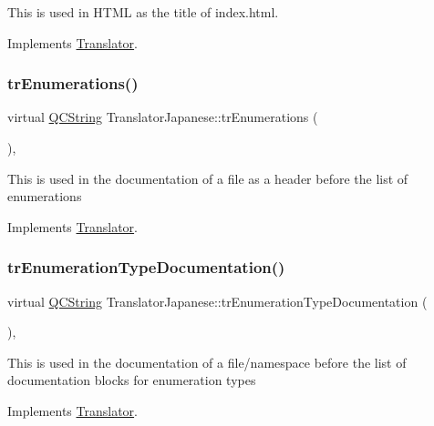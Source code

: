 This is used in H\+T\+ML as the title of index.\+html. 

Implements \mbox{\hyperlink{class_translator}{Translator}}.

\mbox{\label{class_translator_japanese_a77f78f5be3931f3684fd6f74e6b2b133}} 
\subsubsection{\texorpdfstring{trEnumerations()}{trEnumerations()}}
{\footnotesize\ttfamily virtual \mbox{\hyperlink{class_q_c_string}{Q\+C\+String}} Translator\+Japanese\+::tr\+Enumerations (\begin{DoxyParamCaption}{ }\end{DoxyParamCaption})\hspace{0.3cm}{\ttfamily [inline]}, {\ttfamily [virtual]}}

This is used in the documentation of a file as a header before the list of enumerations 

Implements \mbox{\hyperlink{class_translator}{Translator}}.

\mbox{\label{class_translator_japanese_a1165e4f89a8686a1aad2bfcb7d702c0b}} 
\subsubsection{\texorpdfstring{trEnumerationTypeDocumentation()}{trEnumerationTypeDocumentation()}}
{\footnotesize\ttfamily virtual \mbox{\hyperlink{class_q_c_string}{Q\+C\+String}} Translator\+Japanese\+::tr\+Enumeration\+Type\+Documentation (\begin{DoxyParamCaption}{ }\end{DoxyParamCaption})\hspace{0.3cm}{\ttfamily [inline]}, {\ttfamily [virtual]}}

This is used in the documentation of a file/namespace before the list of documentation blocks for enumeration types 

Implements \mbox{\hyperlink{class_translator}{Translator}}.

